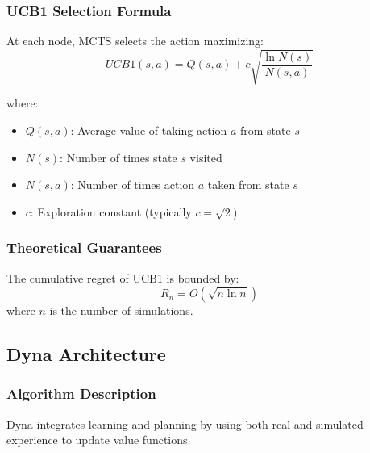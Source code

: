 \documentclass[12pt]{article}
\numberwithin{equation}{section}
\numberwithin{figure}{section}
\numberwithin{table}{section}
\numberwithin{algorithm}{section}
\begin{document}
{{{\subsubsection{UCB1 Selection Formula}
At each node, MCTS selects the action maximizing:
\begin{equation}
UCB1(s,a) = Q(s,a) + c\sqrt{\frac{\ln N(s)}{N(s,a)}}
\end{equation}

where:
\begin{itemize}
    \item $Q(s,a)$: Average value of taking action $a$ from state $s$
    \item $N(s)$: Number of times state $s$ visited
    \item $N(s,a)$: Number of times action $a$ taken from state $s$
    \item $c$: Exploration constant (typically $c = \sqrt{2}$)
\end{itemize}

\subsubsection{Theoretical Guarantees}
\begin{theorem}
The cumulative regret of UCB1 is bounded by:
\begin{equation}
R_n = O(\sqrt{n \ln n})
\end{equation}
where $n$ is the number of simulations.
\end{theorem}

\subsection{Dyna Architecture}

\subsubsection{Algorithm Description}
Dyna integrates learning and planning by using both real and simulated experience to update value functions.

}}}
\end{document}
